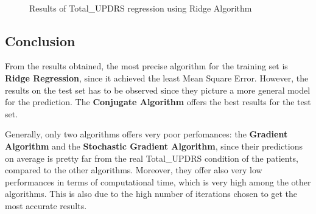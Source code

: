 \documentclass[12pt,a4paper,oneside]{article}
\begin{document}
\begin{figure}[p]
		\\
		\caption{Results of Total\_UPDRS regression using Ridge Algorithm}
		\label{fig:Figure 7}
	\end{figure}
	
	\subsection{Conclusion} From the results obtained, the most precise algorithm for the training set is \textbf{Ridge Regression}, since it achieved the least Mean Square Error. However, the results on the test set has to be observed since they picture a more general model for the prediction. The \textbf{Conjugate Algorithm} offers the best results for the test set.
	
	Generally, only two algorithms offers very poor perfomances: the \textbf{Gradient Algorithm} and the \textbf{Stochastic Gradient Algorithm}, since their predictions on average is pretty far from the real Total\_UPDRS condition of the patients, compared to the other algorithms. Moreover, they offer also very low performances in terms of computational time, which is very high among the other algorithms. This is also due to the high number of iterations chosen to get the most accurate results. 
\end{document}
